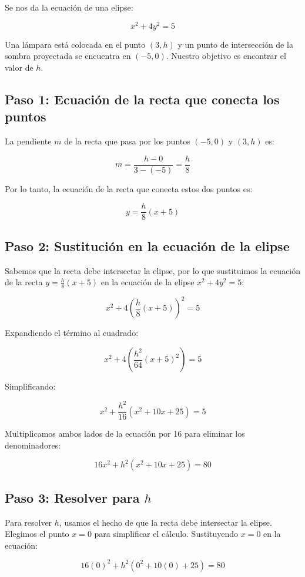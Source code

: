 \documentclass[11pt,letterpaper]{article}
\begin{document}
Se nos da la ecuación de una elipse:

\[
x^2 + 4y^2 = 5
\]

Una lámpara está colocada en el punto \( (3, h) \) y un punto de intersección de la sombra proyectada se encuentra en \( (-5, 0) \). Nuestro objetivo es encontrar el valor de \(h\).

\subsection{Paso 1: Ecuación de la recta que conecta los puntos}

La pendiente \(m\) de la recta que pasa por los puntos \( (-5, 0) \) y \( (3, h) \) es:

\[
m = \frac{h - 0}{3 - (-5)} = \frac{h}{8}
\]

Por lo tanto, la ecuación de la recta que conecta estos dos puntos es:

\[
y = \frac{h}{8}(x + 5)
\]

\subsection*{Paso 2: Sustitución en la ecuación de la elipse}

Sabemos que la recta debe intersectar la elipse, por lo que sustituimos la ecuación de la recta \( y = \frac{h}{8}(x + 5) \) en la ecuación de la elipse \( x^2 + 4y^2 = 5 \):

\[
x^2 + 4\left( \frac{h}{8}(x + 5) \right)^2 = 5
\]

Expandiendo el término al cuadrado:

\[
x^2 + 4\left( \frac{h^2}{64}(x + 5)^2 \right) = 5
\]

Simplificando:

\[
x^2 + \frac{h^2}{16}(x^2 + 10x + 25) = 5
\]

Multiplicamos ambos lados de la ecuación por 16 para eliminar los denominadores:

\[
16x^2 + h^2(x^2 + 10x + 25) = 80
\]

\subsection*{Paso 3: Resolver para \(h\)}

Para resolver \(h\), usamos el hecho de que la recta debe intersectar la elipse. Elegimos el punto \(x = 0\) para simplificar el cálculo. Sustituyendo \(x = 0\) en la ecuación:

\[
16(0)^2 + h^2(0^2 + 10(0) + 25) = 80
\]
\end{document}
